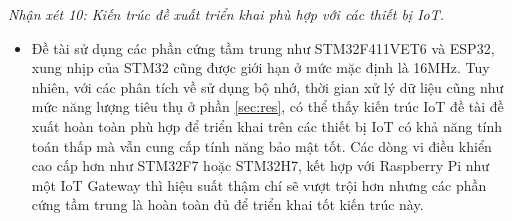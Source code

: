 \textit{Nhận xét 10: Kiến trúc đề xuất triển khai phù hợp với các thiết bị IoT.}
\begin{itemize}
    \item Đề tài sử dụng các phần cứng tầm trung như STM32F411VET6 và ESP32, xung nhịp của STM32 cũng được giới hạn ở mức mặc định là 16MHz. Tuy nhiên, với các phân tích về sử dụng bộ nhớ, thời gian xử lý dữ liệu cũng như mức năng lượng tiêu thụ ở phần \ref{sec:res}, có thể thấy kiến trúc IoT đề tài đề xuất hoàn toàn phù hợp để triển khai trên các thiết bị IoT có khả năng tính toán thấp mà vẫn cung cấp tính năng bảo mật tốt. Các dòng vi điều khiển cao cấp hơn như STM32F7 hoặc STM32H7, kết hợp với Raspberry Pi như một IoT Gateway thì hiệu suất thậm chí sẽ vượt trội hơn nhưng các phần cứng tầm trung là hoàn toàn đủ để triển khai tốt kiến trúc này.
\end{itemize}


